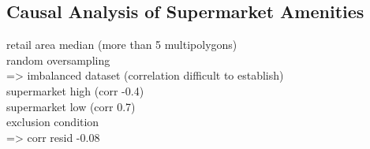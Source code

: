 \documentclass{article}
\begin{document}
\subsection{Causal Analysis of Supermarket Amenities}
retail area median (more than 5 multipolygons) \\
random oversampling \\
    => imbalanced dataset (correlation difficult to establish) \\
    
supermarket high (corr -0.4) \\
supermarket low (corr 0.7) \\

exclusion condition \\ 
    => corr resid -0.08 \\
    
\end{document}

